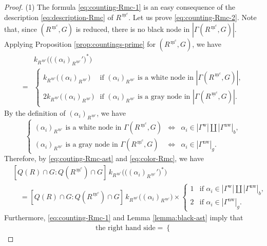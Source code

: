 \documentclass[11pt]{amsart}
\newcommand{\mc}{\, \underline{\mathrm{m}}^c}
\newcommand{\w}{\mathrm{w}}
\newcommand{\nw}{\mathrm{nw}}
\begin{document}
{\begin{proof}
(1) The formula \eqref{eq:counting-Rmc-1} is an easy consequence of the description 
\eqref{eq:description-Rmc} of $R^{\mc}$. Let us prove \eqref{eq:counting-Rmc-2}. 
Note that, since $(R^{\mc},G)$ is reduced, there is no black node in 
$|\Gamma(R^{\mc},G)|$. 
Applying Proposition \ref{prop:countings-prime} for $(R^{\mc},G)$, 
we have
\begin{equation}\label{eq:couting-Rmc-ast}
\begin{split}
&k_{R^{\mc}}\big(\big((\alpha_i)_{R^{\mc}}'\big)^\ast\big) \\
=
&
\begin{cases}
k_{R^{\mc}}\big((\alpha_i)_{R^{\mc}}\big) & 
\text{if $(\alpha_i)_{R^{\mc}}$ is a white node in $|\Gamma(R^{\mc},G)|$},\\
2k_{R^{\mc}}\big((\alpha_i)_{R^{\mc}}\big) & 
\text{if $(\alpha_i)_{R^{\mc}}$ is a gray node in $|\Gamma(R^{\mc},G)|$}.
\end{cases}
\end{split}
\end{equation}
By the definition of $(\alpha_i)_{R^{\mc}}$, we have
\begin{equation}\label{eq:color-Rmc}
\left\{\begin{array}{lllllll}
\text{$(\alpha_i)_{R^{\mc}}$ is a white node in $\Gamma(R^{\mc},G)$} 
& \Longleftrightarrow & \alpha_i\in |\Gamma^\w|\amalg |\Gamma^\nw|_b,\\[3pt]
\text{$(\alpha_i)_{R^{\mc}}$ is a gray node in $\Gamma(R^{\mc},G)$} 
& \Longleftrightarrow & \alpha_i\in |\Gamma^\nw|_g.
\end{array}\right.
\end{equation}
Therefore, by \eqref{eq:couting-Rmc-ast} and
\eqref{eq:color-Rmc}, we have
\begin{align*}
&[Q(R)\cap G:Q(R^{\mc})\cap G]\,
k_{R^{\mc}}\big(\big((\alpha_i)_{R^{\mc}}'\big)^\ast\big)\\
&\quad =[Q(R)\cap G:Q(R^{\mc})\cap G]\,
k_{R^{\mc}}\big((\alpha_i)_{R^{\mc}}\big)\times
\begin{cases}
1 & \text{if $\alpha_i\in |\Gamma^\w|\amalg |\Gamma^\nw|_b$},\\
2 & \text{if $\alpha_i\in |\Gamma^\nw|_g$}.
\end{cases}
\end{align*}
Furthermore, \eqref{eq:counting-Rmc-1} and Lemma \ref{lemma:black-ast}
imply that
\begin{align*}
&\text{the right hand side} =\begin{cases}

\end{cases}
\end{align*}
\end{proof}}
\end{document}
